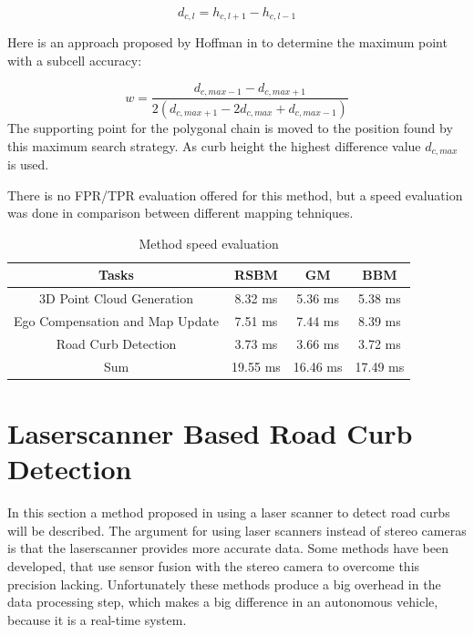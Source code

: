 \begin{equation}
d_{c,l} = h_{c,l + 1} - h_{c,l -1}
\label{eq2}
\end{equation}

 Here is an approach proposed by Hoffman in \cite{hoffmann} to determine the maximum point with a subcell accuracy:



\begin{equation}
\label{eq4}
w = \frac{d_{c,max-1} - d_{c,max+1}}{2(d_{c,max+1} - 2d_{c,max} + d_{c,max-1})}
\end{equation}
The supporting point for the polygonal chain is moved to the position found by this maximum search strategy. As curb height the highest difference value $d_{c,max}$ is used. 


There is no FPR/TPR evaluation offered for this method, but a speed evaluation was done in comparison between different mapping tehniques.

\begin{table}[H]
\centering
\caption{Method speed evaluation}
\begin{tabular}{| c | c | c | c |}
\hline
Tasks & RSBM & GM & BBM \\
\hline
3D Point Cloud Generation & 8.32 ms & 5.36 ms & 5.38 ms \\
\hline
Ego Compensation and Map Update & 7.51 ms & 7.44 ms & 8.39 ms \\
\hline
Road Curb Detection & 3.73 ms & 3.66 ms & 3.72 ms \\
\hline
Sum & 19.55 ms & 16.46 ms & 17.49 ms \\
\hline
\end{tabular}
\end{table}

\section{Laserscanner Based Road Curb Detection}

In this section a method proposed in \cite{lidar13} using a laser scanner to detect road curbs will be described. The argument for using laser scanners instead of stereo cameras is that the laserscanner provides more accurate data. Some methods have been developed, that use sensor fusion with the stereo camera to overcome this precision lacking. Unfortunately these methods produce a big overhead in the data processing step, which makes a big difference in an autonomous vehicle, because it is a real-time system.

